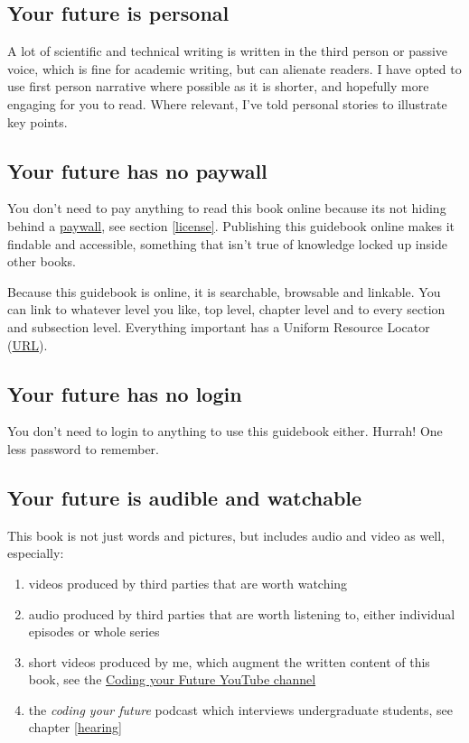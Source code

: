 \documentclass[
]{book}
\providecommand{\tightlist}{%
  \setlength{\itemsep}{0pt}\setlength{\parskip}{0pt}}
\begin{document}
\hypertarget{firstperson}{%
\subsection{Your future is personal}\label{firstperson}}

A lot of scientific and technical writing is written in the third person or passive voice, which is fine for academic writing, but can alienate readers. I have opted to use first person narrative where possible as it is shorter, and hopefully more engaging for you to read. \citep{googler} Where relevant, I've told personal stories to illustrate key points.

\hypertarget{openaccess}{%
\subsection{Your future has no paywall}\label{openaccess}}

You don't need to pay anything to read this book online because its not hiding behind a \href{https://en.wikipedia.org/wiki/Paywall}{paywall}, see section \ref{license}. Publishing this guidebook online makes it findable and accessible, something that isn't true of knowledge locked up inside other books.

Because this guidebook is online, it is searchable, browsable and linkable. You can link to whatever level you like, top level, chapter level and to every section and subsection level. Everything important has a Uniform Resource Locator (\href{https://en.wikipedia.org/wiki/URL}{URL}).

\hypertarget{nologin}{%
\subsection{Your future has no login}\label{nologin}}

You don't need to login to anything to use this guidebook either. Hurrah! One less password to remember.

\hypertarget{av}{%
\subsection{Your future is audible and watchable}\label{av}}

This book is not just words and pictures, but includes audio and video as well, especially:

\begin{enumerate}
\def\labelenumi{\arabic{enumi}.}
\tightlist
\item
  videos produced by third parties that are worth watching
\item
  audio produced by third parties that are worth listening to, either individual episodes or whole series
\item
  short videos produced by me, which augment the written content of this book, see the \href{https://www.youtube.com/channel/UCLBv_u8JmyUPqmRALIjVnLg}{Coding your Future YouTube channel}
\item
  the \emph{coding your future} podcast which interviews undergraduate students, see chapter \ref{hearing}
\end{enumerate}
\end{document}
